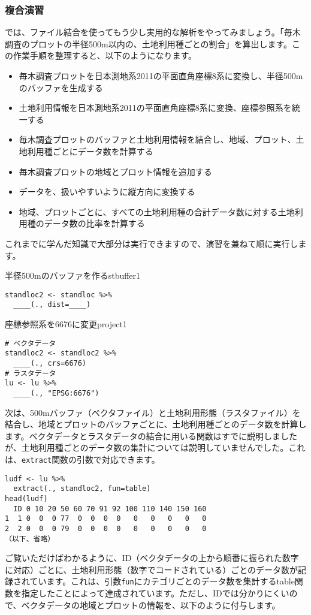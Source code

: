 \subsubsection{複合演習}
では、ファイル結合を使ってもう少し実用的な解析をやってみましょう。「毎木調査のプロットの半径500m以内の、土地利用種ごとの割合」を算出します。この作業手順を整理すると、以下のようになります。
\begin{itemize}
  \item 毎木調査プロットを日本測地系2011の平面直角座標8系に変換し、半径500mのバッファを生成する
  \item 土地利用情報を日本測地系2011の平面直角座標8系に変換、座標参照系を統一する
  \item 毎木調査プロットのバッファと土地利用情報を結合し、地域、プロット、土地利用種ごとにデータ数を計算する
  \item 毎木調査プロットの地域とプロット情報を追加する
  \item データを、扱いやすいように縦方向に変換する
  \item 地域、プロットごとに、すべての土地利用種の合計データ数に対する土地利用種のデータ数の比率を計算する
\end{itemize}
これまでに学んだ知識で大部分は実行できますので、演習を兼ねて順に実行します。

\begin{exercise}{半径500mのバッファを作る}{stbuffer1}
\begin{verbatim}
standloc2 <- standloc %>%
  ____(., dist=____)
\end{verbatim}
\end{exercise}

\begin{exercise}{座標参照系を6676に変更}{project1}
\begin{verbatim}
# ベクタデータ
standloc2 <- standloc2 %>%
  ____(., crs=6676)
# ラスタデータ
lu <- lu %>%
  ____(., "EPSG:6676")
\end{verbatim}
\end{exercise}

次は、500mバッファ（ベクタファイル）と土地利用形態（ラスタファイル）を結合し、地域とプロットのバッファごとに、土地利用種ごとのデータ数を計算します。ベクタデータとラスタデータの結合に用いる関数はすでに説明しましたが、土地利用種ごとのデータ数の集計については説明していませんでした。これは、\verb|extract|関数の引数で対応できます。
\begin{verbatim}
ludf <- lu %>%
  extract(., standloc2, fun=table)
head(ludf)
  ID 0 10 20 50 60 70 91 92 100 110 140 150 160
1  1 0  0  0 77  0  0  0  0   0   0   0   0   0
2  2 0  0  0 79  0  0  0  0   0   0   0   0   0
（以下、省略）
\end{verbatim}
ご覧いただけばわかるように、ID（ベクタデータの上から順番に振られた数字に対応）ごとに、土地利用形態（数字でコードされている）ごとのデータ数が記録されています。これは、引数\verb|fun|にカテゴリごとのデータ数を集計するtable関数を指定したことによって達成されています。ただし、IDでは分かりにくいので、ベクタデータの地域とプロットの情報を、以下のように付与します。

